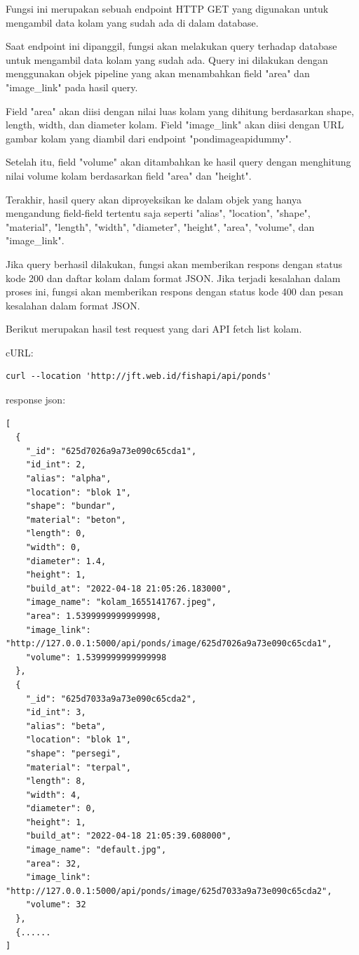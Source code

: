\begin{enumerate}[1.]
Fungsi ini merupakan sebuah endpoint HTTP GET yang digunakan untuk mengambil data kolam yang sudah ada di dalam database.

Saat endpoint ini dipanggil, fungsi akan melakukan query terhadap database untuk mengambil data kolam yang sudah ada. Query ini dilakukan dengan menggunakan objek pipeline yang akan menambahkan field "area" dan "image\_link" pada hasil query.

Field "area" akan diisi dengan nilai luas kolam yang dihitung berdasarkan shape, length, width, dan diameter kolam. Field "image\_link" akan diisi dengan URL gambar kolam yang diambil dari endpoint "pondimageapidummy".

Setelah itu, field "volume" akan ditambahkan ke hasil query dengan menghitung nilai volume kolam berdasarkan field "area" dan "height".

Terakhir, hasil query akan diproyeksikan ke dalam objek yang hanya mengandung field-field tertentu saja seperti "alias", "location", "shape", "material", "length", "width", "diameter", "height", "area", "volume", dan "image\_link".

Jika query berhasil dilakukan, fungsi akan memberikan respons dengan status kode 200 dan daftar kolam dalam format JSON. Jika terjadi kesalahan dalam proses ini, fungsi akan memberikan respons dengan status kode 400 dan pesan kesalahan dalam format JSON.

Berikut merupakan hasil test request yang dari API fetch list kolam.

cURL:

\begin{lstlisting}
curl --location 'http://jft.web.id/fishapi/api/ponds'
\end{lstlisting}

response json:

\begin{lstlisting}
[
  {
    "_id": "625d7026a9a73e090c65cda1",
    "id_int": 2,
    "alias": "alpha",
    "location": "blok 1",
    "shape": "bundar",
    "material": "beton",
    "length": 0,
    "width": 0,
    "diameter": 1.4,
    "height": 1,
    "build_at": "2022-04-18 21:05:26.183000",
    "image_name": "kolam_1655141767.jpeg",
    "area": 1.5399999999999998,
    "image_link": "http://127.0.0.1:5000/api/ponds/image/625d7026a9a73e090c65cda1",
    "volume": 1.5399999999999998
  },
  {
    "_id": "625d7033a9a73e090c65cda2",
    "id_int": 3,
    "alias": "beta",
    "location": "blok 1",
    "shape": "persegi",
    "material": "terpal",
    "length": 8,
    "width": 4,
    "diameter": 0,
    "height": 1,
    "build_at": "2022-04-18 21:05:39.608000",
    "image_name": "default.jpg",
    "area": 32,
    "image_link": "http://127.0.0.1:5000/api/ponds/image/625d7033a9a73e090c65cda2",
    "volume": 32
  },
  {......
]
\end{lstlisting}


\end{enumerate}
